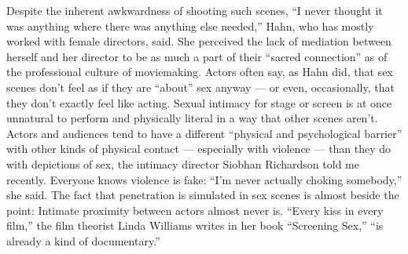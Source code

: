 Despite the inherent awkwardness of shooting such scenes, ``I never
thought it was anything where there was anything else needed,'' Hahn,
who has mostly worked with female directors, said. She perceived the
lack of mediation between herself and her director to be as much a part
of their ``sacred connection'' as of the professional culture of
moviemaking. Actors often say, as Hahn did, that sex scenes don't feel
as if they are ``about'' sex anyway --- or even, occasionally, that they
don't exactly feel like acting. Sexual intimacy for stage or screen is
at once unnatural to perform and physically literal in a way that other
scenes aren't. Actors and audiences tend to have a different ``physical
and psychological barrier'' with other kinds of physical contact ---
especially with violence --- than they do with depictions of sex, the
intimacy director Siobhan Richardson told me recently. Everyone knows
violence is fake: ``I'm never actually choking somebody,'' she said. The
fact that penetration is simulated in sex scenes is almost beside the
point: Intimate proximity between actors almost never is. ``Every kiss
in every film,'' the film theorist Linda Williams writes in her book
``Screening Sex,'' ``is already a kind of documentary.''

